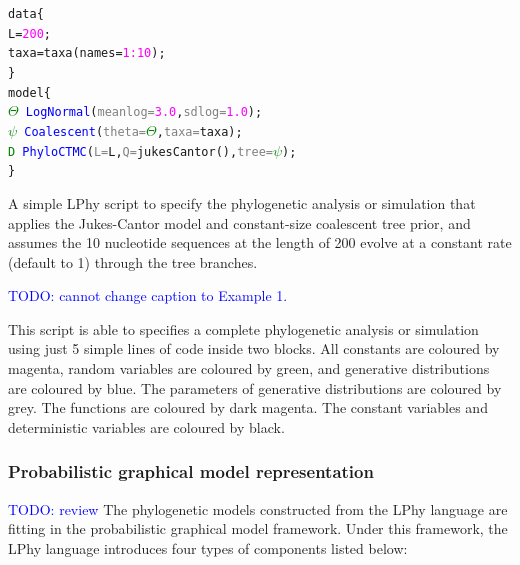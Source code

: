 \documentclass[10pt,letterpaper,table]{article}
\begin{document}
{
  \small
  \begin{listing}
    \begin{alltt}
  data \{
    L = \textcolor{magenta}{200};
    taxa = \textcolor{magenta!80!black}{taxa}(names=\textcolor{magenta}{1:10});
  \}
  model \{
    \textcolor{green}{\(\Theta\)} ~ \textcolor{blue}{LogNormal}(\textcolor{gray}{meanlog=}\textcolor{magenta}{3.0}, \textcolor{gray}{sdlog=}\textcolor{magenta}{1.0});
    \textcolor{green}{\(\psi\)} ~ \textcolor{blue}{Coalescent}(\textcolor{gray}{theta=}\textcolor{green}{\(\Theta\)}, \textcolor{gray}{taxa=}taxa);
    \textcolor{green}{D} ~ \textcolor{blue}{PhyloCTMC}(\textcolor{gray}{L=}L, \textcolor{gray}{Q=}\textcolor{magenta!80!black}{jukesCantor}(), \textcolor{gray}{tree=}\textcolor{green}{\(\psi\)});
  \}
    \end{alltt}
    \caption{A simple LPhy script to specify the phylogenetic analysis or simulation that applies the Jukes-Cantor model and constant-size coalescent tree prior, and assumes the 10 nucleotide sequences at the length of 200 evolve at a constant rate (default to 1) through the tree branches.}
    \label{lphy:jccoal}
  \end{listing}
}
\textcolor{blue}{TODO: cannot change caption to Example 1.}

This script is able to specifies a complete phylogenetic analysis or simulation using just 5 simple lines of code inside two blocks. 
All constants are coloured by magenta, random variables are coloured by green, and generative distributions are coloured by blue. The parameters of generative distributions are coloured by grey. The functions are coloured by dark magenta. The constant variables and deterministic variables are coloured by black.

\subsubsection{Probabilistic graphical model representation}
\textcolor{blue}{TODO: review}
The phylogenetic models constructed from the LPhy language are fitting in the probabilistic graphical model framework\cite{}.
Under this framework, the LPhy language introduces four types of components listed below:
\end{document}
